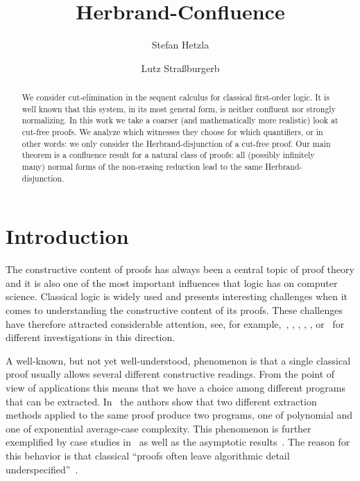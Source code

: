 \documentclass{LMCS}
\title[Herbrand-Confluence]{Herbrand-Confluence\rsuper*}
\author[S.~Hetzl]{Stefan Hetzl\rsuper a}
\author[L.~Stra\ss burger]{Lutz Stra\ss burger\rsuper b}
\theoremstyle{plain}
\theoremstyle{definition}
\begin{document}
\begin{abstract}
We consider cut-elimination in the sequent calculus for classical
first-order logic. It is well known that this system, in its most
general form, is neither confluent nor strongly normalizing. In this
work we take a coarser (and mathematically more realistic) look at
cut-free proofs. We analyze which witnesses they choose for which
quantifiers, or in other words: we only consider the
Herbrand-disjunction of a cut-free proof. Our main theorem is a
confluence result for a natural class of proofs: all (possibly
infinitely many) normal forms of the non-erasing reduction lead to the
same Herbrand-disjunction.
\end{abstract}

\maketitle



\section{Introduction}

The constructive content of proofs has always been a central topic of
proof theory and it is also one of the most important influences that
logic has on computer science.  Classical logic is widely used and
presents interesting challenges when it comes to understanding the
constructive content of its proofs. These challenges have therefore
attracted considerable attention, see, for
example,~\cite{Parigot92LambdaMu,Danos97New,Curien00Duality},
\cite{Barbanera96Symmetric},
\cite{Urban00Classical,Urban01Strong},
\cite{Berger02Refined},
\cite{Kohlenbach08Applied}, or~\cite{Baaz00CutElimination} for
different investigations in this direction.

A well-known, but not yet well-understood, phenomenon is that a single
classical proof usually allows several different constructive
readings. From the point of view of applications this means that we
have a choice among different programs that can be extracted.
In~\cite{Ratiu12Exploring} the authors show that two different
extraction methods applied to the same proof produce two programs, one
of polynomial and one of exponential average-case complexity. This
phenomenon is further exemplified by case studies
in~\cite{Urban00Classical,Baaz05Experiments,Baaz08Ceres} as well as
the asymptotic
results~\cite{Baaz11Nonconfluence,Hetzl12Computational}. The reason
for this behavior is that classical ``proofs often leave algorithmic
detail underspecified''~\cite{Avigad10Computational}.
\end{document}
